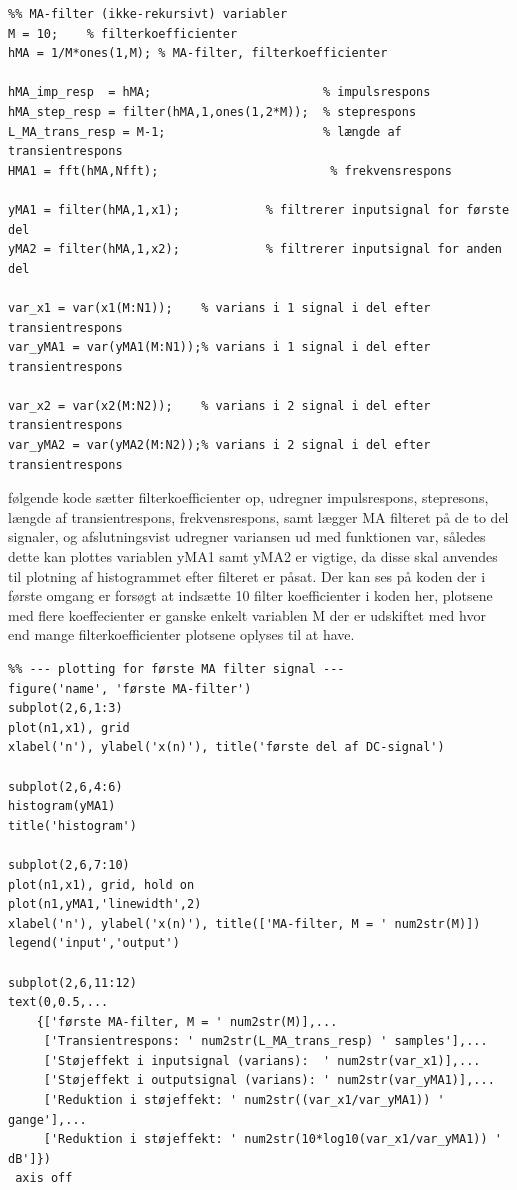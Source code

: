 \documentclass{article}
\begin{document}
\begin{lstlisting}
%% MA-filter (ikke-rekursivt) variabler
M = 10;    % filterkoefficienter
hMA = 1/M*ones(1,M); % MA-filter, filterkoefficienter

hMA_imp_resp  = hMA;                        % impulsrespons
hMA_step_resp = filter(hMA,1,ones(1,2*M));  % steprespons
L_MA_trans_resp = M-1;                      % længde af transientrespons
HMA1 = fft(hMA,Nfft);                        % frekvensrespons

yMA1 = filter(hMA,1,x1);            % filtrerer inputsignal for første del
yMA2 = filter(hMA,1,x2);            % filtrerer inputsignal for anden del

var_x1 = var(x1(M:N1));    % varians i 1 signal i del efter transientrespons
var_yMA1 = var(yMA1(M:N1));% varians i 1 signal i del efter transientrespons

var_x2 = var(x2(M:N2));    % varians i 2 signal i del efter transientrespons
var_yMA2 = var(yMA2(M:N2));% varians i 2 signal i del efter transientrespons
\end{lstlisting}

følgende kode sætter filterkoefficienter op, udregner impulsrespons, stepresons, længde af transientrespons, frekvensrespons, samt lægger MA filteret på de to del signaler, og afslutningsvist udregner variansen ud med funktionen var, således dette kan plottes
variablen yMA1 samt yMA2 er vigtige, da disse skal anvendes til plotning af histogrammet efter filteret er påsat.
Der kan ses på koden der i første omgang er forsøgt at indsætte 10 filter koefficienter i koden her, plotsene med flere koeffecienter er ganske enkelt variablen M der er udskiftet med hvor end mange filterkoefficienter plotsene oplyses til at have.

\begin{lstlisting}
%% --- plotting for første MA filter signal ---
figure('name', 'første MA-filter')
subplot(2,6,1:3)
plot(n1,x1), grid
xlabel('n'), ylabel('x(n)'), title('første del af DC-signal')

subplot(2,6,4:6)
histogram(yMA1)
title('histogram')

subplot(2,6,7:10)
plot(n1,x1), grid, hold on
plot(n1,yMA1,'linewidth',2)
xlabel('n'), ylabel('x(n)'), title(['MA-filter, M = ' num2str(M)])
legend('input','output')

subplot(2,6,11:12)
text(0,0.5,...
    {['første MA-filter, M = ' num2str(M)],...
     ['Transientrespons: ' num2str(L_MA_trans_resp) ' samples'],...
     ['Støjeffekt i inputsignal (varians):  ' num2str(var_x1)],...
     ['Støjeffekt i outputsignal (varians): ' num2str(var_yMA1)],...
     ['Reduktion i støjeffekt: ' num2str((var_x1/var_yMA1)) ' gange'],...
     ['Reduktion i støjeffekt: ' num2str(10*log10(var_x1/var_yMA1)) ' dB']})
 axis off
\end{lstlisting}
\end{document}
